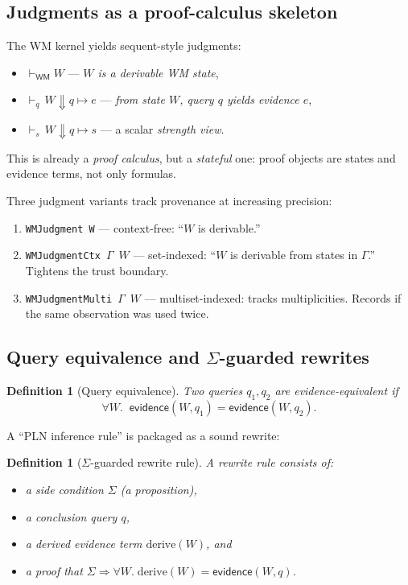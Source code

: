 \documentclass[]{article}
\newtheorem{definition}[theorem]{Definition}
\newcommand{\code}[1]{\texttt{#1}}
\newcommand{\WM}{\mathsf{WM}}
\newcommand{\ev}{\mathsf{evidence}}
\newcommand{\side}{\Sigma}
\begin{document}
\subsection{Judgments as a proof-calculus skeleton}
\label{sec:judgments}

The WM kernel yields sequent-style judgments:

\begin{itemize}[leftmargin=2em]
\item $\vdash_{\WM} W$ --- \emph{$W$ is a derivable WM state},
\item $\vdash_q\, W \Downarrow q \mapsto e$ --- \emph{from state $W$,
  query $q$ yields evidence $e$},
\item $\vdash_s\, W \Downarrow q \mapsto s$ --- a scalar \emph{strength
  view}.
\end{itemize}

This is already a \emph{proof calculus}, but a \emph{stateful} one: proof
objects are states and evidence terms, not only formulas.

Three judgment variants track provenance at increasing precision:

\begin{enumerate}[leftmargin=2em]
\item \code{WMJudgment W} --- context-free: ``$W$ is derivable.''
\item \code{WMJudgmentCtx}~$\Gamma$~$W$ --- set-indexed: ``$W$ is
  derivable from states in $\Gamma$.'' Tightens the trust boundary.
\item \code{WMJudgmentMulti}~$\Gamma$~$W$ --- multiset-indexed: tracks
  multiplicities. Records if the same observation was used twice.
\end{enumerate}


\subsection{Query equivalence and $\Sigma$-guarded rewrites}
\label{sec:rewrites}

\begin{definition}[Query equivalence]
Two queries $q_1,q_2$ are \emph{evidence-equivalent} if
\[
  \forall W.\;\; \ev(W,q_1)=\ev(W,q_2).
\]
\end{definition}

A ``PLN inference rule'' is packaged as a sound rewrite:

\begin{definition}[$\Sigma$-guarded rewrite rule]
\label{def:rewrite}
A rewrite rule consists of:
\begin{itemize}[leftmargin=2em]
\item a side condition $\side$ (a proposition),
\item a conclusion query $q$,
\item a derived evidence term $\mathrm{derive}(W)$, and
\item a proof that $\side \Rightarrow \forall W.\;
  \mathrm{derive}(W)=\ev(W,q)$.
\end{itemize}
\end{definition}
\end{document}
